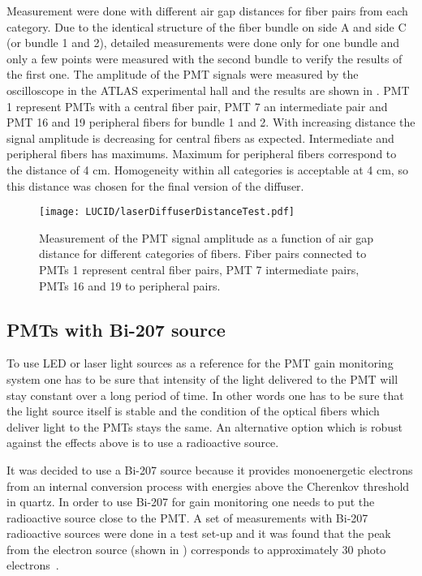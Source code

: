 Measurement were done with different air gap distances for fiber pairs from each category. 
Due to the identical structure of the fiber bundle on side A and side C (or bundle 1 and 2), detailed measurements
were done only for one bundle and only a few points were measured with the second bundle to verify the results of the first one. 
The amplitude of the PMT signals were measured by the oscilloscope in the ATLAS experimental hall
and the results are shown in . 
PMT 1 represent PMTs with a central fiber pair, PMT 7 an intermediate pair and PMT 16 and 19 peripheral fibers for bundle 1 and 2. 
With increasing distance the signal amplitude is decreasing for central fibers as expected. 
Intermediate and peripheral fibers has maximums. Maximum for peripheral fibers correspond to the distance of 4 cm.
Homogeneity within all categories is acceptable at 4 cm, so this distance was chosen for the final version of the diffuser.

\begin{figure}
\centering
\texttt{[image: LUCID/laserDiffuserDistanceTest.pdf]}
\caption{Measurement of the PMT signal amplitude as a function of air gap distance for different categories of fibers. Fiber pairs connected to PMTs 1 represent 
central fiber pairs, PMT 7 intermediate pairs, PMTs 16 and 19 to peripheral pairs.}
\label{fig:laserDiffuserDistanceTest}
\end{figure}

\subsection{PMTs with Bi-207 source}
\label{subsec:bi207Calibration}

To use LED or laser light sources as a reference for the PMT gain monitoring system one has to be sure that intensity of the light delivered to the PMT 
will stay constant over a long period of time. In other words one has to be sure that the light source itself is stable and the condition of 
the optical fibers which deliver light to the PMTs stays the same.
An alternative option which is robust against the effects above is to use a radioactive source.

It was decided to use a Bi-207 source because it provides monoenergetic electrons from an internal conversion process 
with energies above the Cherenkov threshold in quartz.
In order to use Bi-207 for gain monitoring one needs to put the radioactive source close to the PMT.
A set of measurements with Bi-207 radioactive sources were done in a test set-up and it was found that the peak from the electron source 
(shown in ) corresponds to approximately 30 photo electrons~\cite{Alberghi:2016tad}.

